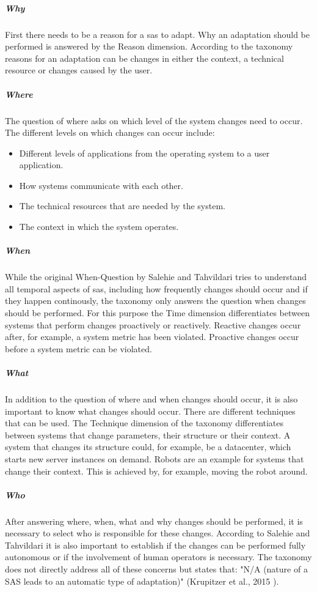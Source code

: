 \subparagraph*{Why}
First there needs to be a reason for a \acrshort{sas} to adapt. Why an adaptation should be performed is answered by the Reason dimension.
According to the taxonomy reasons for an adaptation can be changes in either the context, a technical resource or changes caused by the user.

\subparagraph*{Where}
The question of where asks on which level of the system changes need to occur.
The different levels on which changes can occur include:
\begin{itemize}[nosep]
    \item Different levels of applications from the operating system to a user application.
    \item How systems communicate with each other.
    \item The technical resources that are needed by the system.
    \item The context in which the system operates.
\end{itemize}

\subparagraph*{When}
While the original When-Question by Salehie and Tahvildari tries to understand all temporal aspects of \acrshort{sas},
including how frequently changes should occur and if they happen continously,
the taxonomy only answers the question when changes should be performed.
For this purpose the Time dimension differentiates between systems that perform changes proactively or reactively.
Reactive changes occur after, for example, a system metric has been violated.
Proactive changes occur before a system metric can be violated.

\subparagraph*{What}
In addition to the question of where and when changes should occur, it is also important to know
what changes should occur. There are different techniques that can be used.
The Technique dimension of the taxonomy differentiates between systems that change parameters, their structure or their context.
A system that changes its structure could, for example, be a datacenter, which starts new server instances on demand.
Robots are an example for systems that change their context.
This is achieved by, for example, moving the robot around.

\subparagraph*{Who}
After answering where, when, what and why changes should be performed, 
it is necessary to select who is responsible for these changes.
According to Salehie and Tahvildari it is also important to establish if the changes can be performed fully autonomous
or if the involvement of human operators is necessary.
The taxonomy does not directly address all of these concerns but states that:
"N/A (nature of a SAS leads to an automatic type of adaptation)" (Krupitzer et al., 2015 \cite{SurveyOnEngineeringApproaches}).

